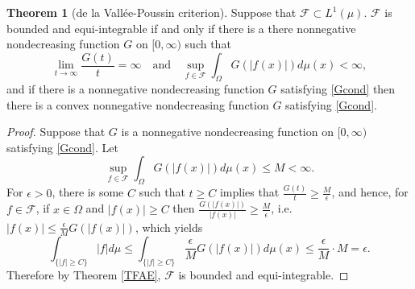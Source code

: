 \documentclass{article}
\theoremstyle{definition}
\newtheorem{theorem}{Theorem}
\theoremstyle{definition}
\begin{document}
\begin{theorem}[de la Vall\'ee-Poussin criterion]
Suppose that $\mathscr{F} \subset L^1(\mu)$. $\mathscr{F}$ is bounded and equi-integrable if and only if  there
is a there nonnegative nondecreasing function $G$ on $[0,\infty)$ such that
\begin{equation}
\lim_{t \to \infty} \frac{G(t)}{t}=\infty \quad \textrm{and}
\quad \sup_{f \in \mathscr{F}} \int_\Omega G(|f(x)|) d\mu(x)<\infty,
\label{Gcond}
\end{equation}
and if there is a nonnegative nondecreasing function $G$ satisfying \eqref{Gcond} then there is a convex
nonnegative nondecreasing function $G$ satisfying \eqref{Gcond}.
\end{theorem}
\begin{proof}
Suppose that $G$ is a nonnegative nondecreasing function on $[0,\infty)$ satisfying \eqref{Gcond}. Let
\[
\sup_{f \in \mathscr{F}} \int_\Omega G(|f(x)|) d\mu(x) \leq M < \infty.
\]
For $\epsilon>0$, there is some $C$ such that $t \geq C$ implies that $\frac{G(t)}{t} \geq \frac{M}{\epsilon}$, and hence, for $f \in \mathscr{F}$,
if $x \in \Omega$ and $|f(x)| \geq C$ then $\frac{G(|f(x)|)}{|f(x)|} \geq \frac{M}{\epsilon}$, i.e.
$|f(x)| \leq \frac{\epsilon}{M} G(|f(x)|)$, which yields
\[
\int_{\{|f| \geq C\}} |f| d\mu \leq \int_{\{|f| \geq C\}} \frac{\epsilon}{M} G(|f(x)|) d\mu(x)
\leq \frac{\epsilon}{M} \cdot M = \epsilon.
\] 
Therefore by Theorem \ref{TFAE}, $\mathscr{F}$ is bounded and equi-integrable. 


\end{proof}
\end{document}
